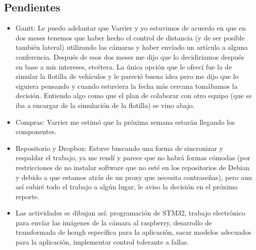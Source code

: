 \subsection{Pendientes}

\begin{itemize}
\item Gantt: Le puedo adelantar que Varrier y yo estuvimos de acuerdo en que en dos meses tenemos que haber hecho el control de distancia (y de ser posible también lateral) utilizando las cámaras y haber envíado un artículo a alguna conferencia. Después de esos dos meses me dijo que lo decidiriamos después en base a mis intereses, etcétera. La única opción que le ofrecí fue la de simular la flotilla de vehículos y le pareció buena idea pero me dijo que lo siguiera pensando y cuando estuviera la fecha más cercana tomábamos la decisión. Entiendo algo como que el plan de colaborar con otro equipo (que se iba a encargar de la simulación de la flotilla) se vino abajo.
\item Compras: Varrier me estimó que la próxima semana estarán llegando los componentes.
\item Repositorio y Dropbox: Estuve buscando una forma de sincronizar y respaldar el trabajo, ya me rendí y parece que no habrá formas cómodas (por restricciones de no instalar software que no esté en los repositorios de Debian y debido a que estamos atrás de un proxy que necesita contraseñas), pero aun así subiré todo el trabajo a algún lugar, le aviso la decisión en el próximo reporte.
\item Las actividades se dibujan así: programación de STM32, trabajo electrónico para envíar las imágenes de la cámara al raspberry, desarrollo de transformada de hough específica para la aplicación, sacar modelos adecuados para la aplicación, implementar control tolerante a fallas.
\end{itemize}

